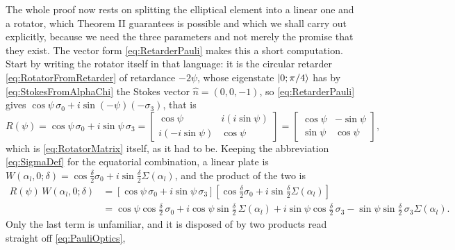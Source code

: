             The whole proof now rests on splitting the elliptical element into a linear one and a rotator, which Theorem II guarantees is possible and which we shall carry out explicitly, because we need the three parameters and not merely the promise that they exist. The vector form \ref{eq:RetarderPauli} makes this a short computation. Start by writing the rotator itself in that language: it is the circular retarder \ref{eq:RotatorFromRetarder} of retardance $-2\psi$, whose eigenstate $\ket{0;\pi/4}$ has by \ref{eq:StokesFromAlphaChi} the Stokes vector $\hat{n}=\left(0,0,-1\right)$, so \ref{eq:RetarderPauli} gives $\cos\psi\,\sigma_0+i\sin(-\psi)\left(-\sigma_3\right)$, that is
            \begin{equation}\label{eq:RotatorPauli}
                R(\psi) = \cos\psi\,\sigma_0+i\sin\psi\,\sigma_3 = \begin{bmatrix}\cos\psi & i\left(i\sin\psi\right)\\ i\left(-i\sin\psi\right) & \cos\psi\end{bmatrix} = \begin{bmatrix}\cos\psi & -\sin\psi\\ \sin\psi & \cos\psi\end{bmatrix},
            \end{equation}
            which is \ref{eq:RotatorMatrix} itself, as it had to be. Keeping the abbreviation \ref{eq:SigmaDef} for the equatorial combination, a linear plate is $W(\alpha_l,0;\delta)=\cos\frac{\delta}{2}\sigma_0+i\sin\frac{\delta}{2}\Sigma(\alpha_l)$, and the product of the two is
            \begin{align}
                R(\psi)\,W\left(\alpha_l,0;\delta\right) &= \left[\cos\psi\,\sigma_0+i\sin\psi\,\sigma_3\right]\left[\cos\frac{\delta}{2}\sigma_0+i\sin\frac{\delta}{2}\Sigma(\alpha_l)\right] \nonumber \\
                &= \cos\psi\cos\frac{\delta}{2}\,\sigma_0 + i\cos\psi\sin\frac{\delta}{2}\,\Sigma(\alpha_l) + i\sin\psi\cos\frac{\delta}{2}\,\sigma_3 - \sin\psi\sin\frac{\delta}{2}\,\sigma_3\Sigma(\alpha_l). \label{eq:EllipticProductRaw}
            \end{align}
            Only the last term is unfamiliar, and it is disposed of by two products read straight off \ref{eq:PauliOptics},
